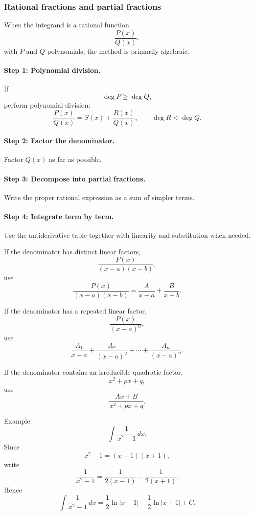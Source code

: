\documentclass{article}
\begin{document}
	\subsubsection{Rational fractions and partial fractions}
	
	When the integrand is a rational function
	\[
	\frac{P(x)}{Q(x)},
	\]
	with \(P\) and \(Q\) polynomials, the method is primarily algebraic.
	
	\paragraph{Step 1: Polynomial division.}
	If
	\[
	\deg P \geq \deg Q,
	\]
	perform polynomial division:
	\[
	\frac{P(x)}{Q(x)}
	=
	S(x)+\frac{R(x)}{Q(x)},
	\qquad \deg R<\deg Q.
	\]
	
	\paragraph{Step 2: Factor the denominator.}
	Factor \(Q(x)\) as far as possible.
	
	\paragraph{Step 3: Decompose into partial fractions.}
	Write the proper rational expression as a sum of simpler terms.
	
	\paragraph{Step 4: Integrate term by term.}
	Use the antiderivative table together with linearity and substitution when needed.
	
	If the denominator has distinct linear factors,
	\[
	\frac{P(x)}{(x-a)(x-b)},
	\]
	use
	\[
	\frac{P(x)}{(x-a)(x-b)}
	=
	\frac{A}{x-a}+\frac{B}{x-b}.
	\]
	
	If the denominator has a repeated linear factor,
	\[
	\frac{P(x)}{(x-a)^n},
	\]
	use
	\[
	\frac{A_1}{x-a}+\frac{A_2}{(x-a)^2}+\cdots+\frac{A_n}{(x-a)^n}.
	\]
	
	If the denominator contains an irreducible quadratic factor,
	\[
	x^2+px+q,
	\]
	use
	\[
	\frac{Ax+B}{x^2+px+q}.
	\]
	
	Example:
	\[
	\int \frac{1}{x^2-1}\,dx.
	\]
	Since
	\[
	x^2-1=(x-1)(x+1),
	\]
	write
	\[
	\frac{1}{x^2-1}
	=
	\frac{1}{2(x-1)}-\frac{1}{2(x+1)}.
	\]
	Hence
	\[
	\int \frac{1}{x^2-1}\,dx
	=
	\frac{1}{2}\ln|x-1|
	-
	\frac{1}{2}\ln|x+1|
	+C.
	\]
	
\end{document}

